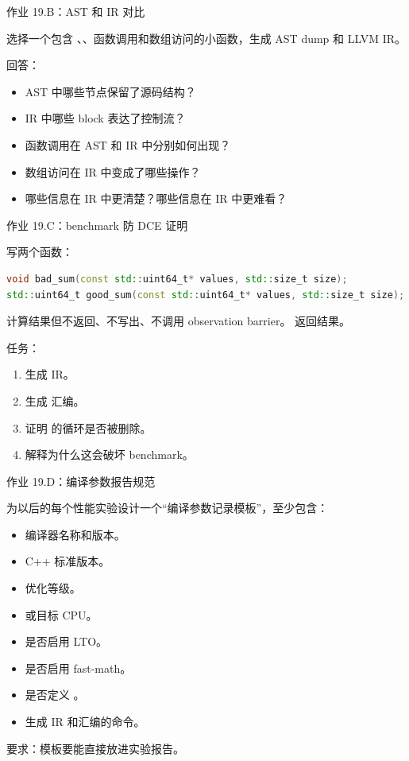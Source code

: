 \begin{exercisebox}
作业 19.B：AST 和 IR 对比

选择一个包含 、、函数调用和数组访问的小函数，生成 AST dump 和 LLVM IR。

回答：

\begin{itemize}
  \item AST 中哪些节点保留了源码结构？
  \item IR 中哪些 block 表达了控制流？
  \item 函数调用在 AST 和 IR 中分别如何出现？
  \item 数组访问在 IR 中变成了哪些操作？
  \item 哪些信息在 IR 中更清楚？哪些信息在 IR 中更难看？
\end{itemize}
\end{exercisebox}

\begin{exercisebox}
作业 19.C：benchmark 防 DCE 证明

写两个函数：

\begin{lstlisting}[language=C++]
void bad_sum(const std::uint64_t* values, std::size_t size);
std::uint64_t good_sum(const std::uint64_t* values, std::size_t size);
\end{lstlisting}

 计算结果但不返回、不写出、不调用 observation barrier。 返回结果。

任务：

\begin{enumerate}
  \item 生成  IR。
  \item 生成  汇编。
  \item 证明  的循环是否被删除。
  \item 解释为什么这会破坏 benchmark。
\end{enumerate}
\end{exercisebox}

\begin{exercisebox}
作业 19.D：编译参数报告规范

为以后的每个性能实验设计一个“编译参数记录模板”，至少包含：

\begin{itemize}
  \item 编译器名称和版本。
  \item C++ 标准版本。
  \item 优化等级。
  \item {} 或目标 CPU。
  \item 是否启用 LTO。
  \item 是否启用 fast-math。
  \item 是否定义 。
  \item 生成 IR 和汇编的命令。
\end{itemize}

要求：模板要能直接放进实验报告。
\end{exercisebox}

